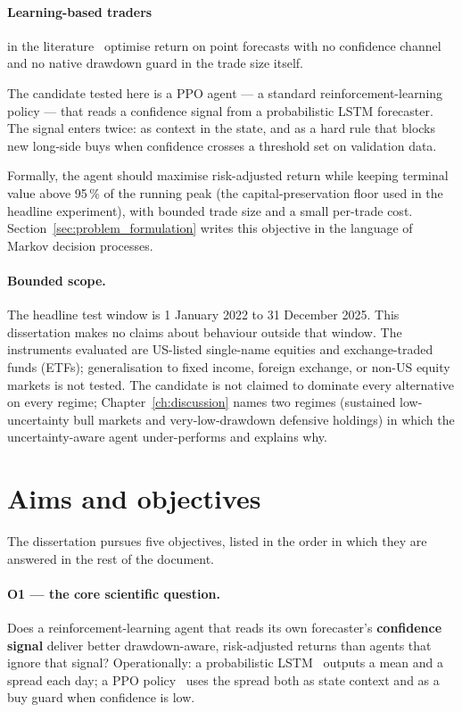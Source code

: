\paragraph{Learning-based traders} in the literature~\parencite{jiang2017deep,yang2020deep,liu2021finrl} optimise return on point forecasts with no confidence channel and no native drawdown guard in the trade size itself.

The candidate tested here is a PPO agent --- a standard reinforcement-learning policy --- that reads a confidence signal from a probabilistic LSTM forecaster. The signal enters twice: as context in the state, and as a hard rule that blocks new long-side buys when confidence crosses a threshold set on validation data.

Formally, the agent should maximise risk-adjusted return while keeping terminal value above 95\,\% of the running peak (the capital-preservation floor used in the headline experiment), with bounded trade size and a small per-trade cost. Section~\ref{sec:problem_formulation} writes this objective in the language of Markov decision processes.

\paragraph{Bounded scope.} The headline test window is 1 January 2022 to 31 December 2025. This dissertation makes no claims about behaviour outside that window. The instruments evaluated are US-listed single-name equities and exchange-traded funds (ETFs); generalisation to fixed income, foreign exchange, or non-US equity markets is not tested. The candidate is not claimed to dominate every alternative on every regime; Chapter~\ref{ch:discussion} names two regimes (sustained low-uncertainty bull markets and very-low-drawdown defensive holdings) in which the uncertainty-aware agent under-performs and explains why.

\section{Aims and objectives}
\label{sec:objectives}

The dissertation pursues five objectives, listed in the order in which they are answered in the rest of the document.

\paragraph{O1 --- the core scientific question.} Does a reinforcement-learning agent that reads its own forecaster's \textbf{confidence signal} deliver better drawdown-aware, risk-adjusted returns than agents that ignore that signal? Operationally: a probabilistic LSTM~\parencite{salinas2020deepar} outputs a mean and a spread each day; a PPO policy~\parencite{schulman2017ppo} uses the spread both as state context and as a buy guard when confidence is low.


